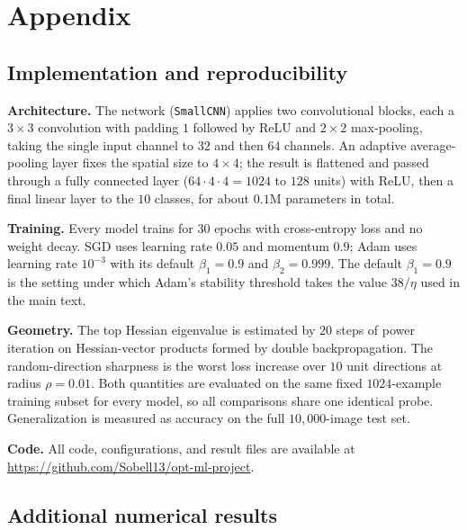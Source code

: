 \documentclass[a4paper,10pt,twoside]{article}
\begin{document}
\newpage
\onecolumn
\section{Appendix}

\subsection{Implementation and reproducibility}
\textbf{Architecture.} The network (\texttt{SmallCNN}) applies two convolutional blocks, each a $3\times3$ convolution with padding $1$ followed by ReLU and $2\times2$ max-pooling, taking the single input channel to $32$ and then $64$ channels. An adaptive average-pooling layer fixes the spatial size to $4\times4$; the result is flattened and passed through a fully connected layer ($64\cdot4\cdot4 = 1024$ to $128$ units) with ReLU, then a final linear layer to the $10$ classes, for about $0.1$M parameters in total.

\textbf{Training.} Every model trains for $30$ epochs with cross-entropy loss and no weight decay. SGD uses learning rate $0.05$ and momentum $0.9$; Adam uses learning rate $10^{-3}$ with its default $\beta_1 = 0.9$ and $\beta_2 = 0.999$. The default $\beta_1 = 0.9$ is the setting under which Adam's stability threshold takes the value $38/\eta$ used in the main text.

\textbf{Geometry.} The top Hessian eigenvalue is estimated by $20$ steps of power iteration on Hessian-vector products formed by double backpropagation. The random-direction sharpness is the worst loss increase over $10$ unit directions at radius $\rho = 0.01$. Both quantities are evaluated on the same fixed $1024$-example training subset for every model, so all comparisons share one identical probe. Generalization is measured as accuracy on the full $10{,}000$-image test set.

\textbf{Code.} All code, configurations, and result files are available at \url{https://github.com/Sobell13/opt-ml-project}.

\subsection{Additional numerical results}
\end{document}

